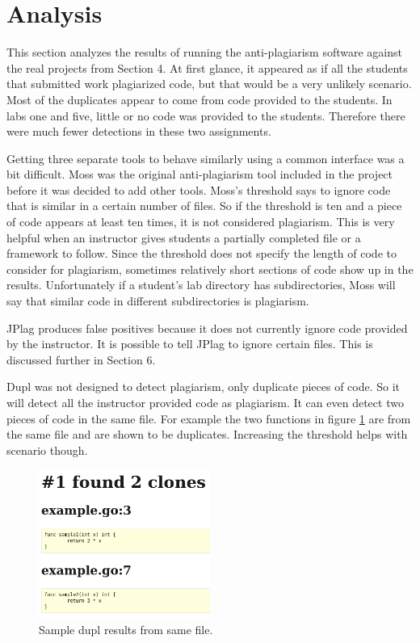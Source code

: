 \documentclass[10pt,journal,compsoc]{IEEEtran}
\begin{document}
	\section{Analysis}
	This section analyzes the results of running the anti-plagiarism software against the real projects from Section 4. At first glance, it appeared as if all the students that submitted work plagiarized code, but that would be a very unlikely scenario. Most of the duplicates appear to come from code provided to the students. In labs one and five, little or no code was provided to the students. Therefore there were much fewer detections in these two assignments.
	
	Getting three separate tools to behave similarly using a common interface was a bit difficult. Moss was the original anti-plagiarism tool included in the project before it was decided to add other tools. Moss's threshold says to ignore code that is similar in a certain number of files. So if the threshold is ten and a piece of code appears at least ten times, it is not considered plagiarism. This is very helpful when an instructor gives students a partially completed file or a framework to follow. Since the threshold does not specify the length of code to consider for plagiarism, sometimes relatively short sections of code show up in the results. Unfortunately if a student's lab directory has subdirectories, Moss will say that similar code in different subdirectories is plagiarism.
	
	JPlag produces false positives because it does not currently ignore code provided by the instructor. It is possible to tell JPlag to ignore certain files. This is discussed further in Section 6.
	
	Dupl was not designed to detect plagiarism, only duplicate pieces of code. So it will detect all the instructor provided code as plagiarism. It can even detect two pieces of code in the same file. For example the two functions in figure \ref{fig:duplSameFile} are from the same file and are shown to be duplicates. Increasing the threshold helps with scenario though.
	
	\begin{figure}[h!]
		\includegraphics[width=0.5\textwidth]{duplSameFile2.png}
		\caption{Sample dupl results from same file.}
		\label{fig:duplSameFile}
	\end{figure}
	
\end{document}
